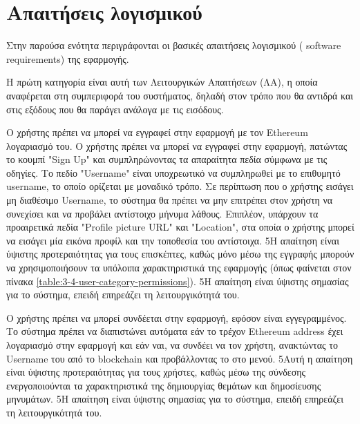 \section{Απαιτήσεις λογισμικού} \label{section:3-5-software-requirements}

Στην παρούσα ενότητα περιγράφονται οι βασικές απαιτήσεις λογισμικού ( \textenglish{software requirements}) της εφαρμογής.

Η πρώτη κατηγορία είναι αυτή των Λειτουργικών Απαιτήσεων (ΛΑ), η οποία αναφέρεται στη συμπεριφορά του συστήματος, δηλαδή στον τρόπο που θα αντιδρά και στις εξόδους που θα παράγει ανάλογα με τις εισόδους.

\begin{enumerate}[label=\textbf{<ΛΑ-\arabic*>}, leftmargin=\parindent, align=left, labelwidth=\parindent, labelsep=0pt]
	\sysReqItem
		{\label{srs:functional-srs-sign-up}}
		{Ο χρήστης πρέπει να μπορεί να εγγραφεί στην εφαρμογή με τον Ethereum λογαριασμό του.}
		{Ο χρήστης πρέπει να μπορεί να εγγραφεί στην εφαρμογή, πατώντας το κουμπί "Sign Up" και συμπληρώνοντας τα απαραίτητα πεδία σύμφωνα με τις οδηγίες. Το πεδίο "Username" είναι υποχρεωτικό να συμπληρωθεί με το επιθυμητό username, το οποίο ορίζεται με μοναδικό τρόπο. Σε περίπτωση που ο χρήστης εισάγει μη διαθέσιμο Username, το σύστημα θα πρέπει να μην επιτρέπει στον χρήστη να συνεχίσει και να προβάλει αντίστοιχο μήνυμα λάθους. Επιπλέον, υπάρχουν τα προαιρετικά πεδία "Profile picture URL" και "Location", στα οποία ο χρήστης μπορεί να εισάγει μία εικόνα προφίλ και την τοποθεσία του αντίστοιχα.}
		{5}{Η απαίτηση είναι ύψιστης προτεραιότητας για τους επισκέπτες, καθώς μόνο μέσω της εγγραφής μπορούν να χρησιμοποιήσουν τα υπόλοιπα χαρακτηριστικά της εφαρμογής (όπως φαίνεται στον πίνακα \ref{table:3-4-user-category-permissions}).}
		{5}{Η απαίτηση είναι ύψιστης σημασίας για το σύστημα, επειδή επηρεάζει τη λειτουργικότητά του.}

	\sysReqItem
		{\label{srs:functional-srs-sign-in}}
		{Ο χρήστης πρέπει να μπορεί συνδέεται στην εφαρμογή, εφόσον είναι εγγεγραμμένος.}
		{Το σύστημα πρέπει να διαπιστώνει αυτόματα εάν το τρέχον Ethereum address έχει λογαριασμό στην εφαρμογή και εάν ναι, να συνδέει να τον χρήστη, ανακτώντας το Username του από το blockchain και προβάλλοντας το στο μενού.}
		{5}{Αυτή η απαίτηση είναι ύψιστης προτεραιότητας για τους χρήστες, καθώς μέσω της σύνδεσης ενεργοποιούνται τα χαρακτηριστικά της δημιουργίας θεμάτων και δημοσίευσης μηνυμάτων.}
		{5}{Η απαίτηση είναι ύψιστης σημασίας για το σύστημα, επειδή επηρεάζει τη λειτουργικότητά του.}


\end{enumerate}
